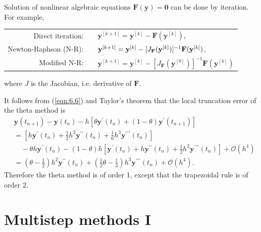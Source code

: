 \documentclass[a4paper]{article}
\begin{document}
Solution of nonlinear algebraic equations $\mathbf{F}(\mathbf{y})= \mathbf{0}$ can be done by iteration. For example,
\begin{center}
    \begin{tabular}{rl}
        Direct iteration:& $\quad \mathbf{y}^{[k+1]}=\mathbf{y}^{[k]}-\mathbf{F}(\mathbf{y}^{[k]})$,\\[0.5em]
Newton-Raphson (N-R):& $\quad \mathbf{y}^{[k+1]}=\mathbf{y}^{[k]}-[J_{\bf F}(\mathbf{y}^{[k]})]^{-1} \mathbf{F}(\mathbf{y}^{[k]})$,\\[0.5em]
Modified N-R:& $\quad \mathbf{y}^{[k+1]}=\mathbf{y}^{[k]}-[J_{\mathbf{F}}(\mathbf{y}^{[0]})]^{-1} \mathbf{F}(\mathbf{y}^{[k]})$
    \end{tabular}
\end{center}
where $J$ is the Jacobian, i.e. derivative of $\mathbf{F}$.

\begin{remark}\label{rmk:6.9}
    It follows from (\ref{eqn:6.6}) and Taylor's theorem that the local truncation error of the theta method is
\[
\begin{aligned}
& \mathbf{y}\left(t_{n+1}\right)-\mathbf{y}\left(t_n\right)-h\left[\theta \mathbf{y}^{\prime}\left(t_n\right)+(1-\theta) \mathbf{y}^{\prime}\left(t_{n+1}\right)\right] \\
&= {\left[h \mathbf{y}^{\prime}\left(t_n\right)+\frac{1}{2} h^2 \mathbf{y}^{\prime \prime}\left(t_n\right)+\frac{1}{6} h^3 \mathbf{y}^{\prime \prime \prime}\left(t_n\right)\right] } \\
& \quad-\theta h \mathbf{y}^{\prime}\left(t_n\right)-(1-\theta) h\left[\mathbf{y}^{\prime}\left(t_n\right)+h \mathbf{y}^{\prime \prime}\left(t_n\right)+\frac{1}{2} h^2 \mathbf{y}^{\prime \prime \prime}\left(t_n\right)\right]+\mathcal{O}\left(h^4\right) \\
&=\left(\theta-\frac{1}{2}\right) h^2 \mathbf{y}^{\prime \prime}\left(t_n\right)+\left(\frac{1}{2} \theta-\frac{1}{3}\right) h^3 \mathbf{y}^{\prime \prime \prime}\left(t_n\right)+\mathcal{O}\left(h^4\right) .
\end{aligned}
\]
Therefore the theta method is of order 1, except that the trapezoidal rule is of order 2.
\end{remark}

\section{Multistep methods I}
\end{document}
